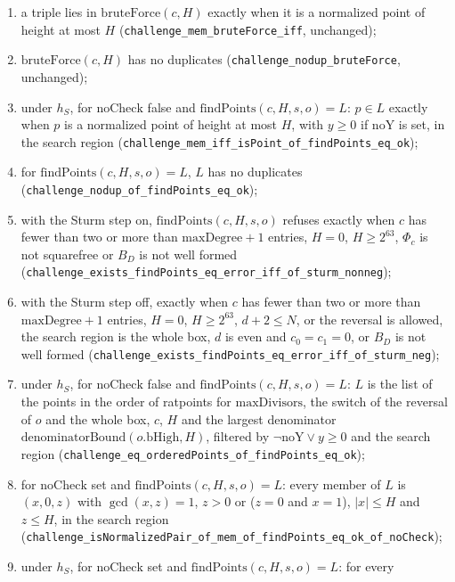 \begin{enumerate}
  \item a triple lies in $\mathrm{bruteForce}(c, H)$ exactly when it is a normalized point of height
    at most $H$ (\verb|challenge_mem_bruteForce_iff|, unchanged);
  \item $\mathrm{bruteForce}(c, H)$ has no duplicates (\verb|challenge_nodup_bruteForce|,
    unchanged);
  \item under $h_S$, for $\mathrm{noCheck}$ false and $\mathrm{findPoints}(c, H, s, o) = L$:
    $p \in L$ exactly when $p$ is a normalized point of height at most $H$, with $y \ge 0$ if
    $\mathrm{noY}$ is set, in the search region
    (\verb|challenge_mem_iff_isPoint_of_findPoints_eq_ok|);
  \item for $\mathrm{findPoints}(c, H, s, o) = L$, $L$ has no duplicates
    (\verb|challenge_nodup_of_findPoints_eq_ok|);
  \item with the Sturm step on, $\mathrm{findPoints}(c, H, s, o)$ refuses exactly when $c$ has fewer
    than two or more than $\mathrm{maxDegree} + 1$ entries, $H = 0$, $H \ge 2^{63}$, $\Phi_c$ is not
    squarefree or $B_D$ is not well formed
    (\verb|challenge_exists_findPoints_eq_error_iff_of_sturm_nonneg|);
  \item with the Sturm step off, exactly when $c$ has fewer than two or more than
    $\mathrm{maxDegree} + 1$ entries, $H = 0$, $H \ge 2^{63}$, $d + 2 \le N$, or the reversal is
    allowed, the search region is the whole box, $d$ is even and $c_0 = c_1 = 0$, or $B_D$ is not
    well formed (\verb|challenge_exists_findPoints_eq_error_iff_of_sturm_neg|);
  \item under $h_S$, for $\mathrm{noCheck}$ false and $\mathrm{findPoints}(c, H, s, o) = L$: $L$ is
    the list of the points in the order of ratpoints for $\mathrm{maxDivisors}$, the switch of the
    reversal of $o$ and the whole box, $c$, $H$ and the largest denominator
    $\mathrm{denominatorBound}(o.\mathrm{bHigh}, H)$, filtered by $\neg\mathrm{noY} \lor y \ge 0$
    and the search region (\verb|challenge_eq_orderedPoints_of_findPoints_eq_ok|);
  \item for $\mathrm{noCheck}$ set and $\mathrm{findPoints}(c, H, s, o) = L$: every member of $L$ is
    $(x, 0, z)$ with $\gcd(x, z) = 1$, $z > 0$ or ($z = 0$ and $x = 1$), $|x| \le H$ and $z \le H$,
    in the search region (\verb|challenge_isNormalizedPair_of_mem_of_findPoints_eq_ok_of_noCheck|);
  \item under $h_S$, for $\mathrm{noCheck}$ set and $\mathrm{findPoints}(c, H, s, o) = L$: for every

\end{enumerate}
